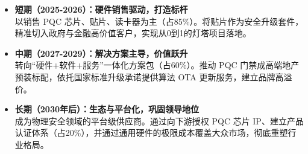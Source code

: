 \begin{itemize}
	\item \textbf{短期（2025-2026）：硬件销售驱动，打造标杆} \\
	以销售 PQC 芯片、贴片、读卡器为主（占85\%）。将贴片作为安全升级套件，精准切入政府与金融高价值客户，实现从0到1的灯塔项目落地。
	
	\item \textbf{中期（2027-2029）：解决方案主导，价值跃升} \\
	转向“硬件+软件+服务”一体化方案包（占60\%）。推动 PQC 门禁成高端地产预装标配，依托国家标准升级承诺提供算法 OTA 更新服务，建立品牌高溢价。
	
	\item \textbf{长期（2030年后）：生态与平台化，巩固领导地位} \\
	成为物理安全领域的平台级供应商。通过向下游授权 PQC 芯片 IP、建立产品认证体系（占20\%），并通过通用硬件的极限成本覆盖大众市场，彻底重塑行业格局。
\end{itemize}